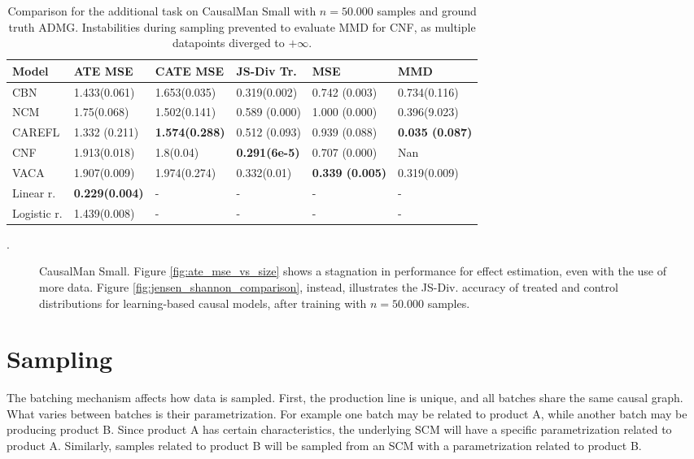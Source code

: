 \begin{table*}[t] 
\centering
\begin{tabular}{ p{1.5cm}|p{1.9cm}|p{1.9cm}|p{1.9cm}|p{1.9cm}|p{1.9cm} }
 Model & ATE MSE & CATE MSE & JS-Div Tr. &  MSE &  MMD\\
 \hline
 CBN   & 1.433(0.061)  & 1.653(0.035) & 0.319(0.002) & 0.742 (0.003) &  0.734(0.116) \\
 NCM   & 1.75(0.068)   & 1.502(0.141) & 0.589 (0.000) & 1.000 (0.000) &  0.396(9.023) \\
 CAREFL & 1.332 (0.211)   & \textbf{1.574(0.288)} & 0.512 (0.093) & 0.939 (0.088) &  \textbf{0.035 (0.087)} \\
 CNF   & 1.913(0.018)   & 1.8(0.04) & \textbf{0.291(6e-5)} & 0.707 (0.000)&   Nan \\
 VACA  & 1.907(0.009)   & 1.974(0.274) & 0.332(0.01) & \textbf{0.339 (0.005)}&  0.319(0.009) \\
 Linear r. & \textbf{0.229(0.004)}   & - & - & - & -  \\
 Logistic r.& 1.439(0.008)   & - & - & - &  - \\
\end{tabular}
\caption{Comparison for the additional task on CausalMan Small with $n = 50.000$ samples and ground truth ADMG. Instabilities during sampling prevented to evaluate MMD for CNF, as multiple datapoints diverged to $+\infty$.}.
\label{table:effect_estimation_results}
\end{table*}
\begin{figure*}[t]
\centering
{}
\caption{CausalMan Small. Figure \ref{fig:ate_mse_vs_size} shows a stagnation in performance for effect estimation, even with the use of more data. 
Figure \ref{fig:jensen_shannon_comparison}, instead, illustrates the JS-Div. accuracy of treated and control distributions for learning-based causal models, after training with $n = 50.000$ samples.}
\end{figure*}
\section{Sampling}\label{appendix:sampling}
The batching mechanism affects how data is sampled. First, the production line is unique, and all batches share the same causal graph. What varies between batches is their parametrization. For example one batch may be related to product A, while another batch may be producing product B. Since product A has certain characteristics, the underlying SCM will have a specific parametrization related to product A. Similarly, samples related to product B will be sampled from an SCM with a parametrization related to product B. 

